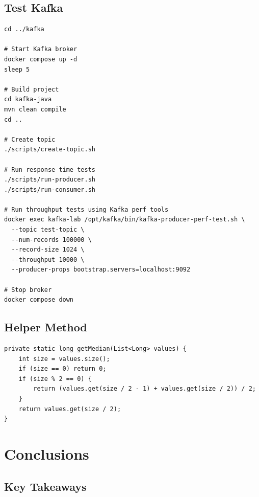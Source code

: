 \documentclass[11pt,a4paper]{article}
\begin{document}
\subsection{Test Kafka}
\begin{lstlisting}[style=bashstyle, caption=Kafka Test Execution]
cd ../kafka

# Start Kafka broker
docker compose up -d
sleep 5

# Build project
cd kafka-java
mvn clean compile
cd ..

# Create topic
./scripts/create-topic.sh

# Run response time tests
./scripts/run-producer.sh
./scripts/run-consumer.sh

# Run throughput tests using Kafka perf tools
docker exec kafka-lab /opt/kafka/bin/kafka-producer-perf-test.sh \
  --topic test-topic \
  --num-records 100000 \
  --record-size 1024 \
  --throughput 10000 \
  --producer-props bootstrap.servers=localhost:9092

# Stop broker
docker compose down
\end{lstlisting}

\subsection{Helper Method}
\begin{lstlisting}[style=javastyle, caption=Median Calculation Utility]
private static long getMedian(List<Long> values) {
    int size = values.size();
    if (size == 0) return 0;
    if (size % 2 == 0) {
        return (values.get(size / 2 - 1) + values.get(size / 2)) / 2;
    }
    return values.get(size / 2);
}
\end{lstlisting}

\newpage
\section{Conclusions}

\subsection{Key Takeaways}
\end{document}
